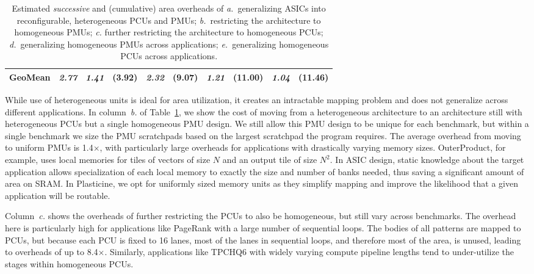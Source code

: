 \begin{table}[]
{\begin{tabular}{l|c|cr|cr|cr|cr}
GeoMean       & \emph{2.77} & \emph{1.41} & (3.92) & \emph{2.32} &  (9.07) & \emph{1.21} & (11.00) & \emph{1.04} & (11.46) \\ \bottomrule %
\end{tabular}
}
\caption{Estimated \emph{successive} and (cumulative) area overheads of \emph{a.}~generalizing ASICs into reconfigurable, heterogeneous PCUs and PMUs; \emph{b.}~restricting the architecture to homogeneous PMUs; \emph{c.} further restricting the architecture to homogeneous PCUs; \emph{d.}~generalizing homogeneous PMUs across applications; \emph{e.}~generalizing homogeneous PCUs across applications.
} %
\label{t-area_overheads}
\vspace{-20pt}
\end{table}


While use of heterogeneous units is ideal for area utilization, it creates an intractable mapping problem and does not generalize across different applications. 
In column~\emph{b.} of Table~\ref{t-area_overheads}, we show the cost of moving from a heterogeneous architecture to an architecture still with heterogeneous PCUs 
but a single homogeneous PMU design. We still allow this PMU design to be unique for each benchmark, but within a single benchmark we size
the PMU scratchpads based on the largest scratchpad the program requires.
The average overhead from moving to uniform PMUs is 1.4$\times$, with particularly large overheads for applications with drastically varying memory sizes.
OuterProduct, for example, uses local memories for tiles of vectors of size $N$ and an output tile of size $N^2$.
In ASIC design, static knowledge about the target application allows specialization of each local memory to exactly the size and number of banks needed, 
thus saving a significant amount of area on SRAM. 
In Plasticine, we opt for uniformly sized memory units as they simplify mapping and improve the likelihood that a given application will be routable.

Column~\emph{c.} shows the overheads of further restricting the PCUs to also be homogeneous, but still vary across benchmarks.
The overhead here is particularly high for applications like PageRank with a large number of sequential loops. 
The bodies of all patterns are mapped to PCUs, but because each PCU is fixed to 16 lanes, most of the lanes in sequential loops, and therefore most of the area, is unused, 
leading to overheads of up to 8.4$\times$.
Similarly, applications like TPCHQ6 with widely varying compute pipeline lengths tend to under-utilize the stages within homogeneous PCUs.

